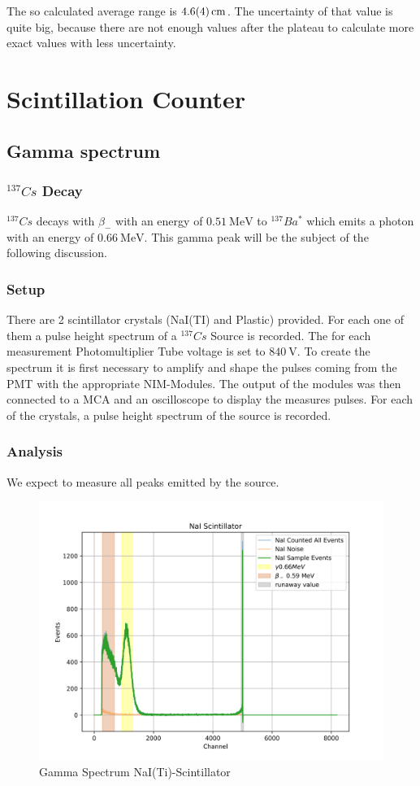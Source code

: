 \documentclass[12pt,twoside,a4paper]{scrartcl}
\begin{document}
    The so calculated average range is $\SI{4.6 \pm 0.4}{\centi\meter}$. The uncertainty
    of that value is quite big, because there are not enough values after the plateau
    to calculate more exact values with less uncertainty.

\section{Scintillation Counter}
	\subsection{Gamma spectrum}
	\label{Gamma}
        \subsubsection{$^{137}Cs$ Decay}
        $^{137} Cs$ decays with $\beta_-$ with an energy of $\SI{0.51}{\mega\electronvolt}$ to
        $^{137}Ba^*$ which emits a photon with an energy of $\SI{0.66}{\mega\electronvolt}$.
        This gamma peak will be the subject of the following discussion.

		\subsubsection{Setup}

		There are 2 scintillator crystals (NaI(TI) and Plastic) provided. For each one of them a pulse height spectrum of a $^{137}Cs$ Source is recorded. The for each measurement Photomultiplier Tube voltage is set to $\SI{840}{\volt}$. To create the spectrum it is first necessary to amplify and shape the pulses coming from the PMT with the appropriate NIM-Modules. The output of the modules was then connected to a MCA and an oscilloscope to display the measures pulses. For each of the crystals, a pulse height spectrum of the source is recorded.

		\subsubsection{Analysis}
            We expect to measure all peaks emitted by the source.

            \begin{figure}[H]
							\centering
                \includegraphics[width = 0.8 \textwidth]{Plots/Scinti/SpektrenNaI.png}
                \caption{Gamma Spectrum NaI(Ti)-Scintillator}
            \end{figure}
\end{document}
